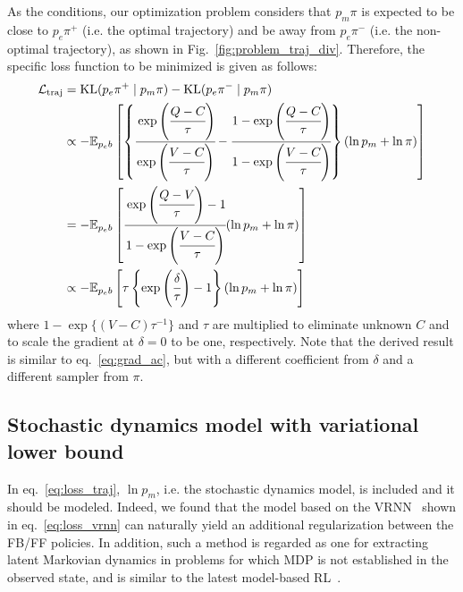 \documentclass{bmcart}
\begin{document}
As the conditions, our optimization problem considers that $p_m \pi$ is expected to be close to $p_e \pi^+$ (i.e. the optimal trajectory) and be away from $p_e \pi^-$ (i.e. the non-optimal trajectory), as shown in Fig.~\ref{fig:problem_traj_div}.
Therefore, the specific loss function to be minimized is given as follows:
\begin{align}
    \mathcal{L}_\mathrm{traj} &= \mathrm{KL}(p_e \pi^+ \mid p_m \pi) - \mathrm{KL}(p_e \pi^- \mid p_m \pi)
    \nonumber \\
    &\propto - \mathbb{E}_{p_e b}\left [ \left \{ \cfrac{\exp\left( \cfrac{Q - C}{\tau} \right)}{\exp\left( \cfrac{V - C}{\tau} \right)} - \cfrac{1 - \exp\left( \cfrac{Q - C}{\tau} \right)}{1 - \exp\left( \cfrac{V - C}{\tau} \right)} \right \} (\ln p_m + \ln \pi) \right ]
    \nonumber \\
    &= - \mathbb{E}_{p_e b}\left [ \cfrac{\exp\left( \cfrac{Q - V}{\tau} \right) - 1}{1 - \exp \left( \cfrac{V - C}{\tau} \right)} (\ln p_m + \ln \pi) \right ]
    \nonumber \\
    &\propto - \mathbb{E}_{p_e b}\left [ \tau \left \{\exp\left( \cfrac{\delta}{\tau} \right) - 1 \right \} (\ln p_m + \ln \pi) \right ]
    \label{eq:loss_traj}
\end{align}
where $1 - \exp \{(V - C)\tau^{-1}\}$ and $\tau$ are multiplied to eliminate unknown $C$ and to scale the gradient at $\delta = 0$ to be one, respectively.
Note that the derived result is similar to eq.~\eqref{eq:grad_ac}, but with a different coefficient from $\delta$ and a different sampler from $\pi$.

\subsection{Stochastic dynamics model with variational lower bound}

In eq.~\eqref{eq:loss_traj}, $\ln p_m$, i.e. the stochastic dynamics model, is included and it should be modeled.
Indeed, we found that the model based on the VRNN~\cite{chung2015recurrent} shown in eq.~\eqref{eq:loss_vrnn} can naturally yield an additional regularization between the FB/FF policies.
In addition, such a method is regarded as one for extracting latent Markovian dynamics in problems for which MDP is not established in the observed state, and is similar to the latest model-based RL~\cite{chua2018deep,clavera2019model}.
\end{document}
